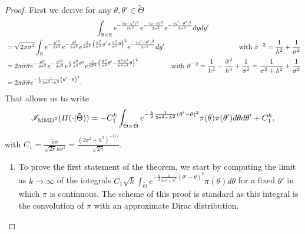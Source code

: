\begin{proof}
    First we derive for any $\theta,\theta'\in\tilde\Theta$
            \begin{multline}
                \int_{\mathbb{R}\times\mathbb{R}} e^{-\frac{(y-y')^2}{2h^2}} e^{-\frac{(y-\theta)^2}{2\sigma^2} } e^{-\frac{(y'-\theta')^2}{2\sigma^2} }  d yd y' 
                    \\
                    \begin{aligned}
                        &= \sqrt{2\pi\tilde\sigma^2}\int_{\mathbb{R}} e^{-\frac{y'^2}{2h^2}}e^{-\frac{\theta^2}{2\sigma^2}} e^{\frac{1}{2\tilde\sigma^2}\left( \frac{\tilde\sigma^2}{h^2}y'+\frac{\tilde\sigma^2}{\sigma^2}\theta \right)^2} e^{-\frac{(y'-\theta')^2}{2\sigma^2}}dy'
                        &\mbox{with }\tilde\sigma^{-2}=\frac{1}{h^2}+\frac{1}{\sigma^2}\\
                    & = 2\pi\tilde\sigma\overline\sigma
                    e^{-\frac{\theta^2}{2\sigma^2}} e^{-\frac{\theta'^2}{2\sigma^2}} e^{\frac{1}{2}\frac{\tilde\sigma^2}{\sigma^4}\theta^2} e^{\frac{1}{2\overline\sigma^2}\left(\frac{\overline\sigma^2}{\sigma^2}\theta' - \frac{\overline\sigma^2\tilde\sigma^2}{h^2\sigma^2}\theta\right)^2} 
                        &\mbox{with }\overline\sigma^{-2}= \frac{1}{h^2} - \frac{\tilde\sigma^2}{h^4} + \frac{1}{\sigma^2} = \frac{1}{\sigma^2+h^2}+\frac{1}{\sigma^2}\\
                    &= 2\pi\tilde\sigma\overline\sigma e^{-\frac{1}{2}\frac{1}{2\sigma^2+h^2}\left(\theta' - \theta\right)^2}. 
                    \end{aligned}
            \end{multline}
        That allows us to write
    \begin{equation}\label{eq:PSGSA:expr2IMMD}
        \mathscr{I}_{\text{MMD}^2}(\varPi(\cdot|\tilde\Theta)) = - C_1^k\int_{\tilde\Theta\times\tilde\Theta} e^{-\frac{k}{2}\frac{1}{2\sigma^2+h^2}(\theta'-\theta)^2}\pi(\theta)\pi(\theta')d\theta d\theta' + C_1^k,
    \end{equation}
with $C_1=\frac{\tilde\sigma\overline{\sigma}}{\sqrt{2\pi}h\sigma^2} = \frac{(2\sigma^2+h^2)^{-1/2}}{\sqrt{2\pi}}$. %
 \begin{enumerate}
    \item To prove the first statement of the theorem, 
    we start by  computing the limit as $k\to\infty$ of the integrals  $C_1\sqrt{k}\int_{\tilde\Theta}e^{-\frac{k}{2}\frac{1}{2\sigma^2+h^2}(\theta'-\theta)^2}\pi(\theta)d\theta $ for a fixed $\theta'$ in which $\pi$ is continuous. The scheme of this proof is standard as this integral is the convolution of  $\pi$ with an approximate Dirac distribution. %

\end{enumerate}
\end{proof}
